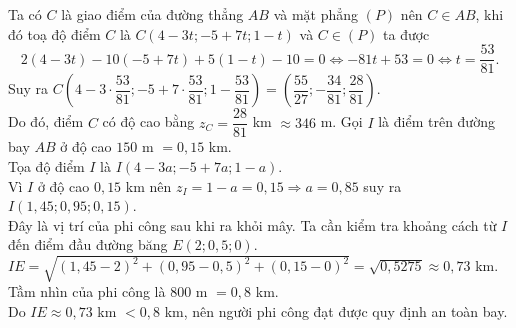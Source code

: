 \begin{ex}
{\begin{itemchoice}
			Ta có $C$ là giao điểm của đường thẳng $AB$ và mặt phẳng $(P)$ nên $C \in AB$, khi đó toạ độ điểm $C$  là $C(4-3t;-5+7t; 1-t)$ và $C \in (P)$ ta được
			 $$2(4-3t)-10(-5+7t)+5(1-t)-10=0\Leftrightarrow-81t+53=0 \Leftrightarrow t=\dfrac{53}{81}.$$
			Suy ra $C\left(4-3\cdot\dfrac{53}{81};-5+7\cdot \dfrac{53}{81}; 1-\dfrac{53}{81}\right)=\left(\dfrac{55}{27};-\dfrac{34}{81};  \dfrac{28}{81}\right)$.\\
			Do đó, điểm $C$ có độ cao bằng $z_C=\dfrac{28}{81}$  km $\approx 346$ m.
			\itemch Gọi $I$ là điểm trên đường bay $AB$  ở độ cao $150$ m $=0{,}15$ km.\\
			Tọa độ  điểm $I$ là $I(4-3a;-5+7a; 1-a)$.\\
			Vì $I$ ở độ cao  $0{,}15$ km nên $z_I=1-a=0{,}15 \Rightarrow a=0{,}85$ suy ra $I(1{,}45; 0{,}95; 0{,}15)$.\\
			Đây là vị trí của phi công sau khi ra khỏi mây. Ta cần kiểm tra khoảng cách từ $I$  đến điểm đầu đường băng $E(2; 0{,}5; 0)$.\\
			$IE=\sqrt{(1{,}45-2)^2+(0{,}95-0{,}5)^2+(0{,}15-0)^2}=\sqrt{0{,}5275}  \approx 0{,}73$ km.\\
			Tầm nhìn của phi công là $800$ m  $=0{,}8$ km.\\
			Do $IE \approx 0{,}73$ km $< 0{,}8$ km, nên người phi công đạt  được quy định an toàn bay.
		\end{itemchoice}
	} 
\end{ex}

